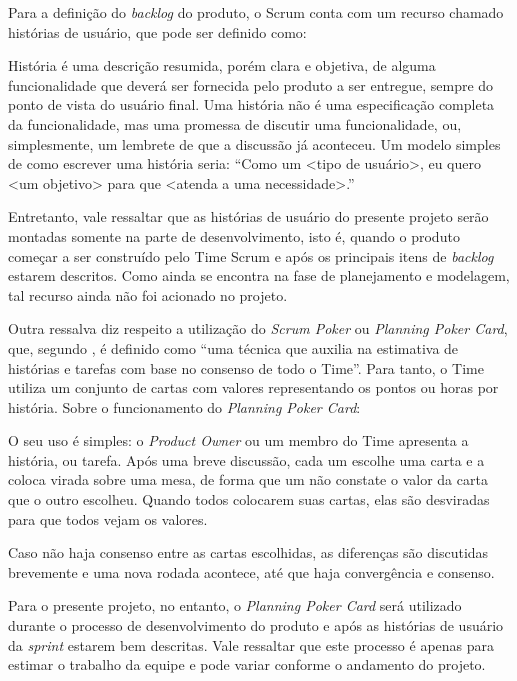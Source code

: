 Para a definição do \textsl{backlog} do produto, o Scrum conta com um recurso chamado histórias de usuário, que pode ser definido como: 

\begin{citacao}

História é uma descrição resumida, porém clara e objetiva, de alguma funcionalidade que deverá ser fornecida pelo produto a ser entregue, sempre do ponto de vista do usuário final. Uma história não é uma especificação completa da funcionalidade, mas uma promessa de discutir uma funcionalidade, ou, simplesmente, um lembrete de que a discussão já aconteceu. Um modelo simples de como escrever uma história seria: “Como um <tipo de usuário>, eu quero <um objetivo> para que <atenda a uma necessidade>.” \cite{cruz:2018}

\end{citacao}

Entretanto, vale ressaltar que as histórias de usuário do presente projeto serão montadas somente na parte de desenvolvimento, isto é, quando o produto começar a ser construído pelo Time Scrum e após os principais itens de \textsl{backlog} estarem descritos. Como ainda se encontra na fase de planejamento e modelagem, tal recurso ainda não foi acionado no projeto.

Outra ressalva diz respeito a utilização do \textsl{Scrum Poker} ou \textsl{Planning Poker Card}, que, segundo , é definido como ``uma técnica que auxilia na estimativa de histórias e tarefas com base no consenso de todo o Time''. Para tanto, o Time utiliza um conjunto de cartas com valores representando os pontos ou horas por história. Sobre o funcionamento do \textsl{Planning Poker Card}:

\begin{citacao}

O seu uso é simples: o \textsl{Product Owner} ou um membro do Time apresenta a história, ou tarefa. Após uma breve discussão, cada um escolhe uma carta e a coloca virada sobre uma mesa, de forma que um não constate o valor da carta que o outro escolheu. Quando todos colocarem suas cartas, elas são desviradas para que todos vejam os valores.

Caso não haja consenso entre as cartas escolhidas, as diferenças são discutidas brevemente e uma nova rodada acontece, até que haja convergência e consenso.\cite{cruz:2018}

\end{citacao}

Para o presente projeto, no entanto, o \textsl{Planning Poker Card} será utilizado durante o processo de desenvolvimento do produto e após as histórias de usuário da \textsl{sprint} estarem bem descritas. Vale ressaltar que este processo é apenas para estimar o trabalho da equipe e pode variar conforme o andamento do projeto.

